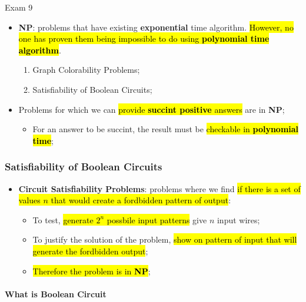 \documentclass{note}
\begin{document}
\begin{note}{Exam 9}
    \begin{itemize}
        \item \textbf{NP}: problems that have existing \textbf{exponential} time algorithm. \hl{However, no one has proven them being 
        impossible to do using \textbf{polynomial time algorithm}}.
        
        \begin{enumerate}
            \item Graph Colorability Problems;
            \item Satisfiability of Boolean Circuits;
        \end{enumerate}

        \item Problems for which we can \hl{provide \textbf{succint positive} answers} are in \textbf{NP};
        \begin{itemize}
            \item For an answer to be succint, the result must be \hl{checkable in \textbf{polynomial time}};
        \end{itemize}
    \end{itemize}

        \subsubsection{Satisfiability of Boolean Circuits}

        \begin{itemize}
            \item \textbf{Circuit Satisfiability Problems}: problems where we find \hl{if there is a set of values $ n $ 
            that would create a fordbidden pattern of output}:
            \begin{itemize}
                \item To test, \hl{generate $ 2^{n} $ possbile input patterns} give $ n $ input wires;
                \item To justify the solution of the problem, \hl{show on pattern of input that will generate the fordbidden output};
                \item \hl{Therefore the problem is in \textbf{NP}};
            \end{itemize}
        \end{itemize}

        \paragraph{What is Boolean Circuit}


\end{note}
\end{document}
